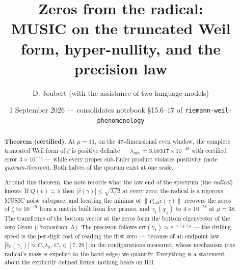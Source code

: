 \documentclass[11pt]{article}
\title{Zeros from the radical:\\ \large MUSIC on the truncated Weil form, hyper-nullity, and the precision law}
\author{D. Joubert (with the assistance of two language models)}
\date{1 September 2026 --- consolidates notebook \S15.6--17 of \texttt{riemann-weil-phenomenology}}
\theoremstyle{remark}\newtheorem*{remark}{Remark}
\begin{document}
\maketitle
\begin{abstract}
\textbf{Theorem (certified).} At $\mu=11$, on the 47-dimensional even window, the complete truncated Weil form of $\zeta$ is positive definite --- $\lambda_{\min}=3.58317\times10^{-48}$ with certified error $3\times10^{-54}$ --- while every proper sub-Euler product violates positivity (note \emph{quorum-theorem}). Both halves of the quorum exist at one scale.

Around this theorem, the note records what the low end of the spectrum (the \emph{radical}) knows. If $Q(v)=\lambda$ then $|\hat v(\gamma)|\le\sqrt{\lambda/2}$ at every zero: the radical is a rigorous MUSIC noise subspace, and locating the minima of $\|P_{\mathrm{rad}}\hat c(\gamma)\|$ recovers the zeros of $\zeta$ to $10^{-19}$ from a matrix built from five primes, and $\gamma_1(\chi_3)$ to $4\times10^{-58}$ at $\mu=38$. The transforms of the bottom vector at the zeros form the bottom eigenvector of the zero Gram (Proposition~A). The precision follows $\mathrm{err}(\gamma_1)\approx e^{-s(\chi)\mu}$ --- the drilling speed is the per-digit cost of reading the first zero --- because of an endpoint law $|\hat v_0(\gamma_1)|\approx C_\gamma\lambda_0$, $C_\gamma\in[7,28]$ in the configurations measured, whose mechanism (the radical's mass is expelled to the band edge) we quantify. Everything is a statement about the explicitly defined forms; nothing bears on RH.
\end{abstract}
\end{document}
